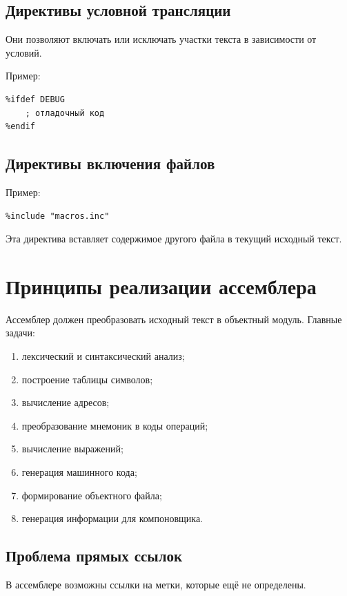 \documentclass[12pt,a4paper]{article}
\begin{document}
\subsection{Директивы условной трансляции}

Они позволяют включать или исключать участки текста в зависимости от условий.

Пример:

\begin{lstlisting}
%ifdef DEBUG
    ; отладочный код
%endif
\end{lstlisting}

\subsection{Директивы включения файлов}

Пример:

\begin{lstlisting}
%include "macros.inc"
\end{lstlisting}

Эта директива вставляет содержимое другого файла в текущий исходный текст.

\section{Принципы реализации ассемблера}

Ассемблер должен преобразовать исходный текст в объектный модуль. Главные задачи:

\begin{enumerate}
    \item лексический и синтаксический анализ;
    \item построение таблицы символов;
    \item вычисление адресов;
    \item преобразование мнемоник в коды операций;
    \item вычисление выражений;
    \item генерация машинного кода;
    \item формирование объектного файла;
    \item генерация информации для компоновщика.
\end{enumerate}

\subsection{Проблема прямых ссылок}

В ассемблере возможны ссылки на метки, которые ещё не определены.
\end{document}

